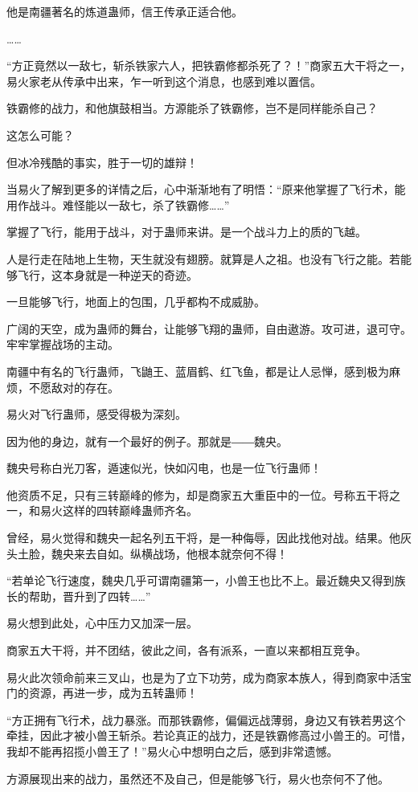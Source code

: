 \begin{this_body}
他是南疆著名的炼道蛊师，信王传承正适合他。

……

“方正竟然以一敌七，斩杀铁家六人，把铁霸修都杀死了？！”商家五大干将之一，易火家老从传承中出来，乍一听到这个消息，也感到难以置信。

铁霸修的战力，和他旗鼓相当。方源能杀了铁霸修，岂不是同样能杀自己？

这怎么可能？

但冰冷残酷的事实，胜于一切的雄辩！

当易火了解到更多的详情之后，心中渐渐地有了明悟：“原来他掌握了飞行术，能用作战斗。难怪能以一敌七，杀了铁霸修……”

掌握了飞行，能用于战斗，对于蛊师来讲。是一个战斗力上的质的飞越。

人是行走在陆地上生物，天生就没有翅膀。就算是人之祖。也没有飞行之能。若能够飞行，这本身就是一种逆天的奇迹。

一旦能够飞行，地面上的包围，几乎都构不成威胁。

广阔的天空，成为蛊师的舞台，让能够飞翔的蛊师，自由遨游。攻可进，退可守。牢牢掌握战场的主动。

南疆中有名的飞行蛊师，飞鼬王、蓝眉鹤、红飞鱼，都是让人忌惮，感到极为麻烦，不愿敌对的存在。

易火对飞行蛊师，感受得极为深刻。

因为他的身边，就有一个最好的例子。那就是――魏央。

魏央号称白光刀客，遁速似光，快如闪电，也是一位飞行蛊师！

他资质不足，只有三转巅峰的修为，却是商家五大重臣中的一位。号称五干将之一，和易火这样的四转巅峰蛊师齐名。

曾经，易火觉得和魏央一起名列五干将，是一种侮辱，因此找他对战。结果。他灰头土脸，魏央来去自如。纵横战场，他根本就奈何不得！

“若单论飞行速度，魏央几乎可谓南疆第一，小兽王也比不上。最近魏央又得到族长的帮助，晋升到了四转……”

易火想到此处，心中压力又加深一层。

商家五大干将，并不团结，彼此之间，各有派系，一直以来都相互竞争。

易火此次领命前来三叉山，也是为了立下功劳，成为商家本族人，得到商家中活宝门的资源，再进一步，成为五转蛊师！

“方正拥有飞行术，战力暴涨。而那铁霸修，偏偏远战薄弱，身边又有铁若男这个牵挂，因此才被小兽王斩杀。若论真正的战力，还是铁霸修高过小兽王的。可惜，我却不能再招揽小兽王了！”易火心中想明白之后，感到非常遗憾。

方源展现出来的战力，虽然还不及自己，但是能够飞行，易火也奈何不了他。


\end{this_body}
